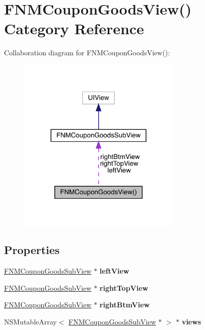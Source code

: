 \hypertarget{category_f_n_m_coupon_goods_view_07_08}{}\section{F\+N\+M\+Coupon\+Goods\+View() Category Reference}
\label{category_f_n_m_coupon_goods_view_07_08}


Collaboration diagram for F\+N\+M\+Coupon\+Goods\+View()\+:\nopagebreak
\begin{figure}[H]
\begin{center}
\leavevmode
\includegraphics[width=221pt]{category_f_n_m_coupon_goods_view_07_08__coll__graph}
\end{center}
\end{figure}
\subsection*{Properties}
\begin{DoxyCompactItemize}
\item 
\mbox{\label{category_f_n_m_coupon_goods_view_07_08_ae245806f32626c3b735b5fd105ae2ad7}} 
\mbox{\hyperlink{interface_f_n_m_coupon_goods_sub_view}{F\+N\+M\+Coupon\+Goods\+Sub\+View}} $\ast$ {\bfseries left\+View}
\item 
\mbox{\label{category_f_n_m_coupon_goods_view_07_08_a900d95c856c831d87172f8408d5c632c}} 
\mbox{\hyperlink{interface_f_n_m_coupon_goods_sub_view}{F\+N\+M\+Coupon\+Goods\+Sub\+View}} $\ast$ {\bfseries right\+Top\+View}
\item 
\mbox{\label{category_f_n_m_coupon_goods_view_07_08_a850f7e97a198413226a59c7cc0f94415}} 
\mbox{\hyperlink{interface_f_n_m_coupon_goods_sub_view}{F\+N\+M\+Coupon\+Goods\+Sub\+View}} $\ast$ {\bfseries right\+Btm\+View}
\item 
\mbox{\label{category_f_n_m_coupon_goods_view_07_08_a9debfb2834e8bef01b02253a16dab581}} 
N\+S\+Mutable\+Array$<$ \mbox{\hyperlink{interface_f_n_m_coupon_goods_sub_view}{F\+N\+M\+Coupon\+Goods\+Sub\+View}} $\ast$ $>$ $\ast$ {\bfseries views}
\end{DoxyCompactItemize}



